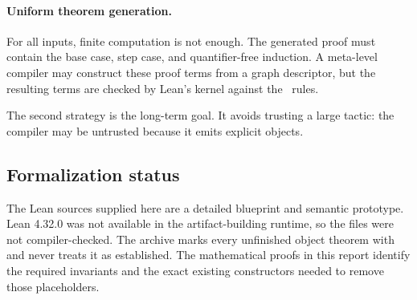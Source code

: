 \paragraph{Uniform theorem generation.}
For all inputs, finite computation is not enough.  The generated proof must
contain the base case, step case, and quantifier-free induction.  A
meta-level compiler may construct these proof terms from a graph descriptor,
but the resulting terms are checked by Lean's kernel against the \PRAAx\
rules.

The second strategy is the long-term goal.  It avoids trusting a large tactic:
the compiler may be untrusted because it emits explicit \code{Prf} objects.

\subsection{Formalization status}

The Lean sources supplied here are a detailed blueprint and semantic
prototype.  Lean 4.32.0 was not available in the artifact-building runtime,
so the files were not compiler-checked.  The archive marks every unfinished
object theorem with \code{sorry} and never treats it as established.
The mathematical proofs in this report identify the required invariants and
the exact existing constructors needed to remove those placeholders.
